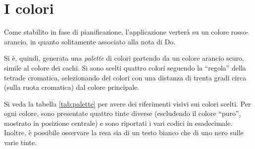 \section{I colori}

Come stabilito in fase di pianificazione, l'applicazione verterà su un colore
rosso-arancio, in quanto solitamente associato alla nota di Do. 

Si è, quindi, generata una \emph{palette} di colori partendo da un colore
arancio scuro, simile al colore dei cachi. Si sono scelti quattro colori
seguendo la ``regola'' della tetrade cromatica, selezionando dei colori con una
distanza di trenta gradi circa (sulla ruota cromatica) dal colore principale.

Si veda la tabella \ref{tab:palette} per avere dei riferimenti visivi sui colori
scelti. Per ogni colore, sono presentate quattro tinte diverse (escludendo il
colore ``puro'', mostrato in posizione centrale) e sono riportati i vari codici
in esadecimale. Inoltre, è possibile osservare la resa sia di un testo bianco
che di uno nero sulle varie tinte.

